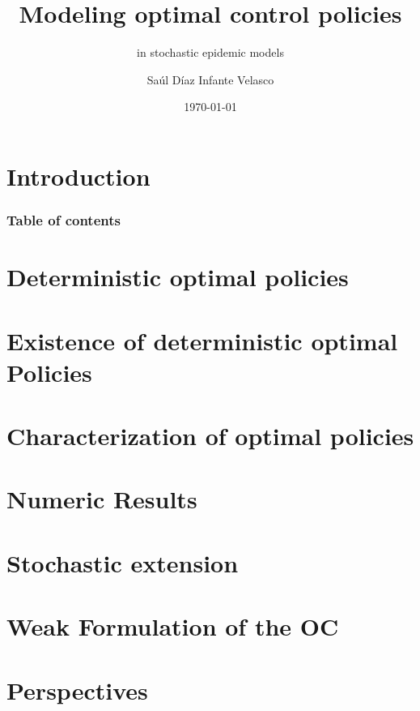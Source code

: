\documentclass[9pt]{beamer}
\title{Modeling optimal control policies}
\subtitle{in stochastic epidemic models}
\author{Saúl Díaz Infante Velasco}
\institute{CONACYT-UNIVERSIDAD de SONORA}
\date{\today}
\begin{document}
    \titlepage
    \section{Introduction}
        
    \begin{frame}
        \frametitle{Table of contents}
        \tableofcontents
    \end{frame}
    \section{Deterministic optimal policies}
        
        
    \section{Existence of deterministic optimal Policies}
        
    \section{Characterization of optimal policies}
        
    \section{Numeric Results}
        
    \section{Stochastic extension}
    \section{Weak Formulation of the OC}
    \section{Perspectives}
        
\end{document}

